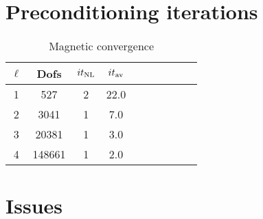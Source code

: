 \documentclass{article}
\begin{document}
\section{Preconditioning iterations}

\begin{table}[h!]
\begin{center}
\begin{tabular}{cccccccccc}
\hline \hline
$\ell$ &    Dofs & $it_{\rm NL}$& $it_{\rm av}$ \\
\hline \hline
  1 &   527    & 2 & 22.0 \\
  2 &  3041    & 1 & 7.0\\
  3 & 20381    & 1 & 3.0\\
  4 & 148661   & 1 & 2.0\\
\hline \hline
\end{tabular}
\caption{Magnetic convergence}
\label{tab:Its}
\end{center}
\end{table}
\section{Issues}
\end{document}
